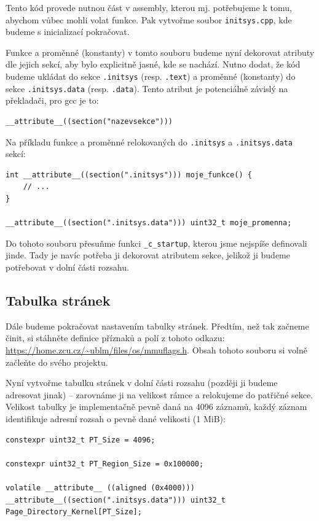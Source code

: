 \documentclass{article}
\begin{document}
Tento kód provede nutnou část v assembly, kterou mj. potřebujeme k tomu, abychom vůbec mohli volat funkce. Pak vytvořme soubor {\tt initsys.cpp}, kde budeme s inicializací pokračovat.

Funkce a proměnné (konstanty) v tomto souboru budeme nyní dekorovat atributy dle jejich sekcí, aby bylo explicitně jasné, kde se nachází. Nutno dodat, že kód budeme ukládat do sekce {\tt .initsys} (resp. {\tt .text}) a proměnné (konstanty) do sekce {\tt .initsys.data} (resp. {\tt .data}). Tento atribut je potenciálně závislý na překladači, pro gcc je to:

\begin{lstlisting}
__attribute__((section("nazevsekce")))
\end{lstlisting}

Na příkladu funkce a proměnné relokovaných do {\tt .initsys} a {\tt .initsys.data} sekcí:
\begin{lstlisting}
int __attribute__((section(".initsys"))) moje_funkce() {
    // ...
}

__attribute__((section(".initsys.data"))) uint32_t moje_promenna;
\end{lstlisting}

Do tohoto souboru přesuňme funkci {\tt \_c\_startup}, kterou jsme nejspíše definovali jinde. Tady je navíc potřeba ji dekorovat atributem sekce, jelikož ji budeme potřebovat v dolní části rozsahu.

\subsection{Tabulka stránek}

Dále budeme pokračovat nastavením tabulky stránek. Předtím, než tak začneme činit, si stáhněte definice příznaků a polí z tohoto odkazu: \url{https://home.zcu.cz/~ublm/files/os/mmuflags.h}. Obsah tohoto souboru si volně začleňte do svého projektu.

Nyní vytvořme tabulku stránek v dolní části rozsahu (později ji budeme adresovat jinak) -- zarovnáme ji na velikost rámce a relokujeme do patřičné sekce. Velikost tabulky je implementačně pevně daná na 4096 záznamů, každý záznam identifikuje adresní rozsah o pevně dané velikosti (1 MiB):
\begin{lstlisting}
constexpr uint32_t PT_Size = 4096;

constexpr uint32_t PT_Region_Size = 0x100000;
	
volatile __attribute__ ((aligned (0x4000))) __attribute__((section(".initsys.data"))) uint32_t Page_Directory_Kernel[PT_Size];
\end{lstlisting}
\end{document}
